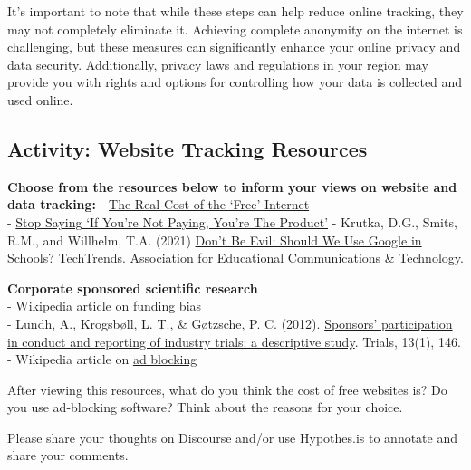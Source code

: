 \documentclass[
]{book}
\theoremstyle{definition}
\theoremstyle{definition}
\theoremstyle{definition}
\theoremstyle{definition}
\theoremstyle{remark}
\begin{document}
It's important to note that while these steps can help reduce online tracking, they may not completely eliminate it. Achieving complete anonymity on the internet is challenging, but these measures can significantly enhance your online privacy and data security. Additionally, privacy laws and regulations in your region may provide you with rights and options for controlling how your data is collected and used online.

\hypertarget{activity-website-tracking-resources}{%
\subsection*{Activity: Website Tracking Resources}\label{activity-website-tracking-resources}}

\begin{reflect}
\textbf{Choose from the resources below to inform your views on website and data tracking:}
- \href{http://mediashift.org/2018/01/real-cost-free-internet/}{The Real Cost of the `Free' Internet}\\
- \href{https://www.techdirt.com/2012/12/20/stop-saying-if-youre-not-paying-youre-product/}{Stop Saying `If You're Not Paying, You're The Product'}
- Krutka, D.G., Smits, R.M., and Willhelm, T.A. (2021) \href{https://link.springer.com/article/10.1007/s11528-021-00599-4}{Don't Be Evil: Should We Use Google in Schools?} TechTrends. Association for Educational Communications \& Technology.

\textbf{Corporate sponsored scientific research}\\
- Wikipedia article on \href{https://en.wikipedia.org/wiki/Funding_bias}{funding bias}\\
- Lundh, A., Krogsbøll, L. T., \& Gøtzsche, P. C. (2012). \href{https://trialsjournal.biomedcentral.com/articles/10.1186/1745-6215-13-146}{Sponsors' participation in conduct and reporting of industry trials: a descriptive study}. Trials, 13(1), 146.\\
- Wikipedia article on \href{https://en.wikipedia.org/wiki/Ad_blocking}{ad blocking}

After viewing this resources, what do you think the cost of free websites is? Do you use ad-blocking software? Think about the reasons for your choice.

Please share your thoughts on Discourse and/or use Hypothes.is to annotate and share your comments.
\end{reflect}
\end{document}
